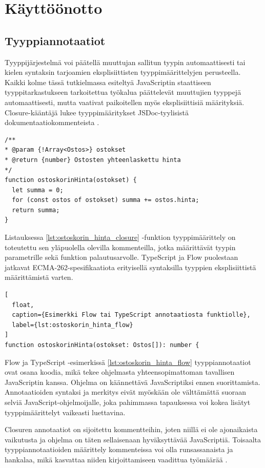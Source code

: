 \chapter{Käyttöönotto}

\section{Tyyppiannotaatiot}

Tyyppijärjestelmä voi päätellä muuttujan sallitun tyypin automaattisesti
tai kielen syntaksin tarjoamien eksplisiittisten tyyppimäärittelyjen
perusteella. Kaikki kolme tässä tutkielmassa esiteltyä JavaScriptin staattiseen
tyyppitarkastukseen tarkoitettua työkalua päättelevät muuttujien tyyppejä
automaattisesti, mutta vaativat paikoitellen myös eksplisiittisiä määrityksiä.
Closure-kääntäjä lukee
tyyppimääritykset JSDoc-tyylisistä dokumentaatiokommenteista \cite{annotatingJSforClosure}.
\begin{lstlisting}[caption={Esimerkki Closure-annotaatiosta funktiolle},label={lst:ostoskorin_hinta_closure}]
/**
* @param {!Array<Ostos>} ostokset
* @return {number} Ostosten yhteenlaskettu hinta
*/
function ostoskorinHinta(ostokset) {
  let summa = 0;
  for (const ostos of ostokset) summa += ostos.hinta;
  return summa;
}
\end{lstlisting}
Listauksessa \ref{lst:ostoskorin_hinta_closure} -funktion
tyyppimäärittely on toteutettu sen yläpuolella olevilla kommenteilla, jotka määrittävät
tyypin  parametrille sekä funktion palautusarvolle.
TypeScript ja Flow puolestaan jatkavat ECMA-262-spe\-si\-fi\-kaa\-ti\-o\-ta
erityisellä syntaksilla tyyppien eksplisiittistä määrittämistä varten. 
\begin{lstlisting}[
  float,
  caption={Esimerkki Flow tai TypeScript annotaatiosta funktiolle},
  label={lst:ostoskorin_hinta_flow}
]
function ostoskorinHinta(ostokset: Ostos[]): number {
\end{lstlisting}
Flow ja TypeScript -esimerkissä \ref{lst:ostoskorin_hinta_flow}
tyyppiannotaatiot ovat osana koodia, mikä
tekee ohjelmasta yhteensopimattoman tavallisen JavaScriptin kanssa. Ohjelma
on käännettävä JavaScriptiksi ennen suorittamista. Annotaatioiden
syntaksi ja merkitys eivät myöskään ole välttämättä suoraan selviä
JavaScript-ohjelmoijalle, joka pahimmassa tapauksessa voi kokea lisätyt
tyyppimäärittelyt vaikeasti luettavina. 

Closuren annotaatiot on sijoitettu kommentteihin, joten niillä ei ole
ajonaikaista vaikutusta ja ohjelma on täten sellaisenaan hyväksyttävää
JavaScriptiä. Toisaalta tyyppiannotaatioiden määrittely kommenteissa voi
olla runsassanaista ja hankalaa, mikä kasvattaa niiden kirjoittamiseen vaadittua
työmäärää \cite{TypeScriptSpec, TypeScriptatBuild}.

